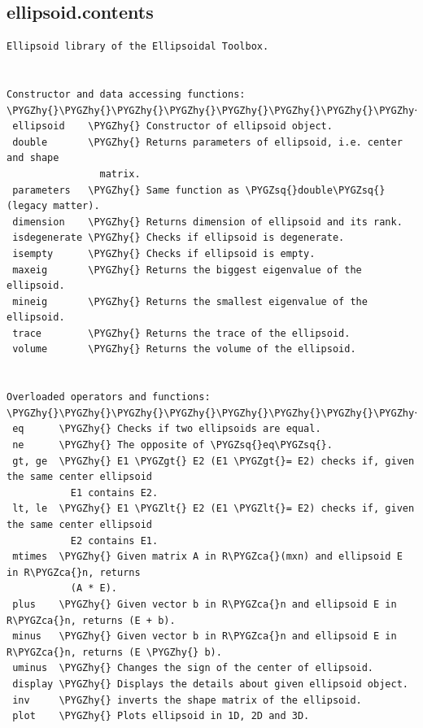 \documentclass[letterpaper,10pt,english]{sphinxmanual}
\def\PYGZca{\char`\^}
\def\PYGZlt{\char`\<}
\def\PYGZgt{\char`\>}
\def\PYGZhy{\char`\-}
\def\PYGZsq{\char`\'}
\begin{document}
\subsection{ellipsoid.contents}
\label{chap_functions:ellipsoid-contents}
\begin{Verbatim}[commandchars=\\\{\}]
Ellipsoid library of the Ellipsoidal Toolbox.


Constructor and data accessing functions:
\PYGZhy{}\PYGZhy{}\PYGZhy{}\PYGZhy{}\PYGZhy{}\PYGZhy{}\PYGZhy{}\PYGZhy{}\PYGZhy{}\PYGZhy{}\PYGZhy{}\PYGZhy{}\PYGZhy{}\PYGZhy{}\PYGZhy{}\PYGZhy{}\PYGZhy{}\PYGZhy{}\PYGZhy{}\PYGZhy{}\PYGZhy{}\PYGZhy{}\PYGZhy{}\PYGZhy{}\PYGZhy{}\PYGZhy{}\PYGZhy{}\PYGZhy{}\PYGZhy{}\PYGZhy{}\PYGZhy{}\PYGZhy{}\PYGZhy{}\PYGZhy{}\PYGZhy{}\PYGZhy{}\PYGZhy{}\PYGZhy{}\PYGZhy{}\PYGZhy{}\PYGZhy{}
 ellipsoid    \PYGZhy{} Constructor of ellipsoid object.
 double       \PYGZhy{} Returns parameters of ellipsoid, i.e. center and shape
                matrix.
 parameters   \PYGZhy{} Same function as \PYGZsq{}double\PYGZsq{}(legacy matter).
 dimension    \PYGZhy{} Returns dimension of ellipsoid and its rank.
 isdegenerate \PYGZhy{} Checks if ellipsoid is degenerate.
 isempty      \PYGZhy{} Checks if ellipsoid is empty.
 maxeig       \PYGZhy{} Returns the biggest eigenvalue of the ellipsoid.
 mineig       \PYGZhy{} Returns the smallest eigenvalue of the ellipsoid.
 trace        \PYGZhy{} Returns the trace of the ellipsoid.
 volume       \PYGZhy{} Returns the volume of the ellipsoid.


Overloaded operators and functions:
\PYGZhy{}\PYGZhy{}\PYGZhy{}\PYGZhy{}\PYGZhy{}\PYGZhy{}\PYGZhy{}\PYGZhy{}\PYGZhy{}\PYGZhy{}\PYGZhy{}\PYGZhy{}\PYGZhy{}\PYGZhy{}\PYGZhy{}\PYGZhy{}\PYGZhy{}\PYGZhy{}\PYGZhy{}\PYGZhy{}\PYGZhy{}\PYGZhy{}\PYGZhy{}\PYGZhy{}\PYGZhy{}\PYGZhy{}\PYGZhy{}\PYGZhy{}\PYGZhy{}\PYGZhy{}\PYGZhy{}\PYGZhy{}\PYGZhy{}\PYGZhy{}\PYGZhy{}
 eq      \PYGZhy{} Checks if two ellipsoids are equal.
 ne      \PYGZhy{} The opposite of \PYGZsq{}eq\PYGZsq{}.
 gt, ge  \PYGZhy{} E1 \PYGZgt{} E2 (E1 \PYGZgt{}= E2) checks if, given the same center ellipsoid
           E1 contains E2.
 lt, le  \PYGZhy{} E1 \PYGZlt{} E2 (E1 \PYGZlt{}= E2) checks if, given the same center ellipsoid
           E2 contains E1.
 mtimes  \PYGZhy{} Given matrix A in R\PYGZca{}(mxn) and ellipsoid E in R\PYGZca{}n, returns
           (A * E).
 plus    \PYGZhy{} Given vector b in R\PYGZca{}n and ellipsoid E in R\PYGZca{}n, returns (E + b).
 minus   \PYGZhy{} Given vector b in R\PYGZca{}n and ellipsoid E in R\PYGZca{}n, returns (E \PYGZhy{} b).
 uminus  \PYGZhy{} Changes the sign of the center of ellipsoid.
 display \PYGZhy{} Displays the details about given ellipsoid object.
 inv     \PYGZhy{} inverts the shape matrix of the ellipsoid.
 plot    \PYGZhy{} Plots ellipsoid in 1D, 2D and 3D.



\end{Verbatim}
\end{document}
